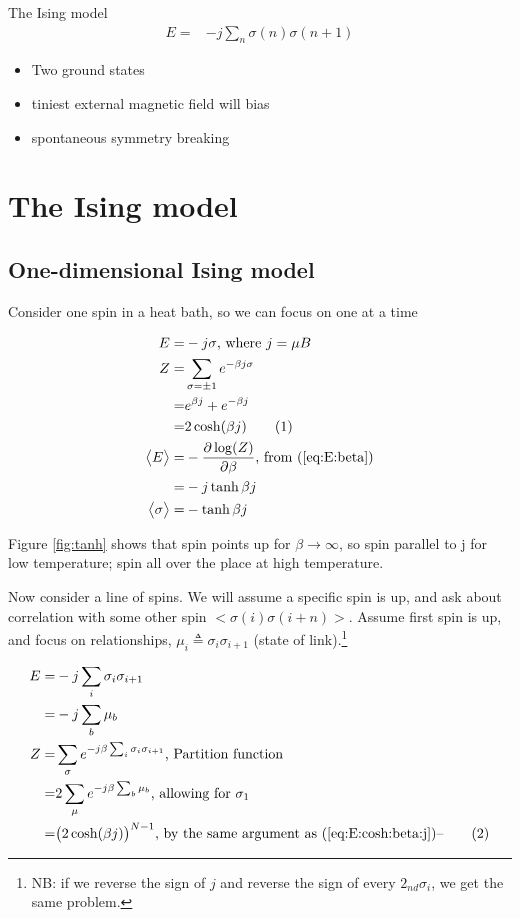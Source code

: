 \documentclass[]{article}
\newcommand\numberthis{\addtocounter{equation}{1}\tag{\theequation}}
\begin{document}
The Ising model
\begin{align*}
E =& - j \sum_{n} \sigma(n) \sigma(n+1)
\end{align*}

\begin{itemize}
	\item Two ground states
	\item tiniest external magnetic field will bias
	\item spontaneous symmetry breaking
\end{itemize}


\section{The Ising model}

\subsection{One-dimensional Ising model}

Consider one spin in a heat bath, so we can focus on one at a time

\begin{align*}
E =& -j \sigma \text{, where $j=\mu B$}\\
Z =& \sum_{\sigma=\pm 1} e^{-\beta j \sigma}\\
=& e^{\beta j}+ e^{- \beta j}\\
=& 2 \cosh(\beta j) \numberthis \label{eq:E:cosh:beta:j}\\
\big<E\big> =& - \frac{\partial \log(Z)}{\partial \beta}\text{, from (\ref{eq:E:beta})}\\
=& - j \tanh{\beta j}\\
\big<\sigma\big> =& - \tanh{\beta j}
\end{align*}

Figure \ref{fig:tanh} shows that spin points up for $\beta\rightarrow\infty$, so spin parallel to j for low temperature; spin all over the place at high temperature.

Now consider a line of spins. We will assume a specific spin is up, and ask about correlation with some other spin $\big<\sigma(i) \sigma(i+n)\big>$. Assume first spin is up, and focus on relationships, $\mu_i\triangleq\sigma_i\sigma_{i+1}$ (state of link).\footnote{NB: if we reverse the sign of $j$ and reverse the sign of every $2_{nd} \sigma_i$, we get the same problem. }

\begin{align*}
E =& -j \sum_i \sigma_i \sigma_{i+1}\\
=& -j \sum_{b} \mu_b\\
Z =& \sum_{\sigma} e^{- j \beta\sum_i  \sigma_i \sigma_{i+1}} \text{, Partition function}\\
=& 2 \sum_{\mu} e^{- j \beta  \sum_b \mu_b} \text{, allowing for $\sigma_1$}\\
=& \big(2 \cosh(\beta j)\big)^{N-1}\text{, by the same argument as (\ref{eq:E:cosh:beta:j})--}\numberthis \label{eq:Z:cosh} 
\end{align*}
\end{document}
